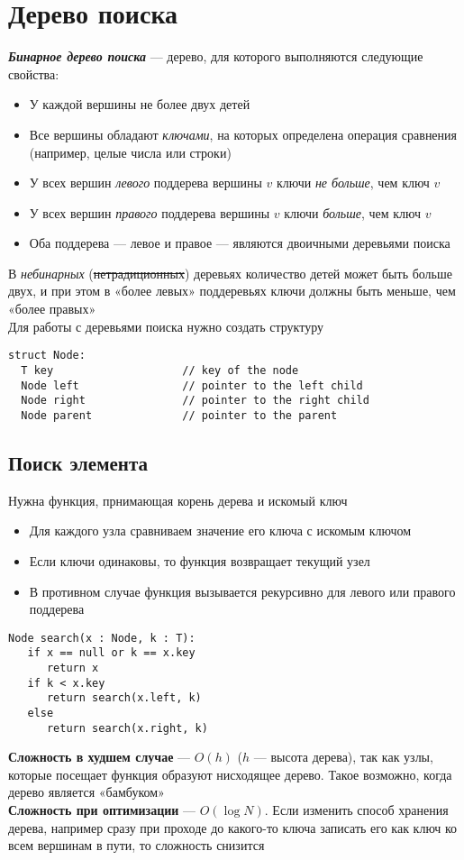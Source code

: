\documentclass[a4paper]{article}
\begin{document}
\section{Дерево поиска}
\textbf{\textit{Бинарное дерево поиска}} — дерево, для которого выполняются следующие свойства:
\begin{itemize}
\item У каждой вершины не более двух детей
\item Все вершины обладают \textit{ключами}, на которых определена операция сравнения (например, целые числа или строки)
\item У всех вершин \textit{левого} поддерева вершины $v$ ключи \textit{не больше}, чем ключ $v$
\item У всех вершин \textit{правого} поддерева вершины $v$ ключи \textit{больше}, чем ключ $v$
\item Оба поддерева — левое и правое — являются двоичными деревьями поиска
\end{itemize}
В \textit{небинарных} (\sout{нетрадиционных}) деревьях количество детей может быть больше двух, и при этом в «более левых» поддеревьях ключи должны быть меньше, чем «более правых»\\[2mm]
\indent Для работы с деревьями поиска нужно создать структуру
\begin{lstlisting}
struct Node:
  T key                    // key of the node
  Node left                // pointer to the left child
  Node right               // pointer to the right child
  Node parent              // pointer to the parent
\end{lstlisting}
\subsection{Поиск элемента}
Нужна функция, прнимающая корень дерева и искомый ключ
\begin{itemize}
    \item Для каждого узла сравниваем значение его ключа с искомым ключом
    \item Если ключи одинаковы, то функция возвращает текущий узел
    \item В противном случае функция вызывается рекурсивно для левого или правого поддерева
\end{itemize}
\begin{lstlisting}
Node search(x : Node, k : T):
   if x == null or k == x.key
      return x
   if k < x.key
      return search(x.left, k)
   else
      return search(x.right, k)
\end{lstlisting}
\textbf{Сложность в худшем случае} — $O(h)$ ($h$ — высота дерева), так как узлы, которые посещает функция образуют нисходящее дерево. Такое возможно, когда дерево является «бамбуком»\\[2mm]
\textbf{Сложность при оптимизации} — $O(\log N)$. Если изменить способ хранения дерева, например сразу при проходе до какого-то ключа записать его как ключ ко всем вершинам в пути, то сложность снизится
\end{document}
